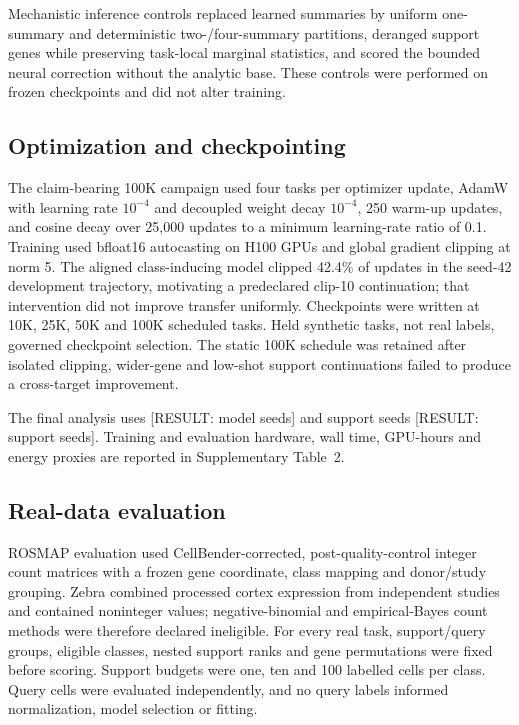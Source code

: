 \documentclass[12pt]{article}
\newcommand{\resultplaceholder}[1]{\textcolor{red!75!black}{[RESULT: #1]}}
\begin{document}
Mechanistic inference controls replaced learned summaries by uniform one-summary and deterministic two-/four-summary partitions, deranged support genes while preserving task-local marginal statistics, and scored the bounded neural correction without the analytic base. These controls were performed on frozen checkpoints and did not alter training.

\subsection*{Optimization and checkpointing}

The claim-bearing 100K campaign used four tasks per optimizer update, AdamW with learning rate $10^{-4}$ and decoupled weight decay $10^{-4}$\cite{loshchilov2019adamw}, 250 warm-up updates, and cosine decay over 25,000 updates to a minimum learning-rate ratio of 0.1\cite{loshchilov2017sgdr}. Training used bfloat16 autocasting on H100 GPUs and global gradient clipping at norm 5. The aligned class-inducing model clipped 42.4\% of updates in the seed-42 development trajectory, motivating a predeclared clip-10 continuation; that intervention did not improve transfer uniformly. Checkpoints were written at 10K, 25K, 50K and 100K scheduled tasks. Held synthetic tasks, not real labels, governed checkpoint selection. The static 100K schedule was retained after isolated clipping, wider-gene and low-shot support continuations failed to produce a cross-target improvement.

The final analysis uses \resultplaceholder{model seeds} and support seeds \resultplaceholder{support seeds}. Training and evaluation hardware, wall time, GPU-hours and energy proxies are reported in Supplementary Table~2.

\subsection*{Real-data evaluation}

ROSMAP evaluation used CellBender-corrected, post-quality-control integer count matrices with a frozen gene coordinate, class mapping and donor/study grouping. Zebra combined processed cortex expression from independent studies and contained noninteger values; negative-binomial and empirical-Bayes count methods were therefore declared ineligible. For every real task, support/query groups, eligible classes, nested support ranks and gene permutations were fixed before scoring. Support budgets were one, ten and 100 labelled cells per class. Query cells were evaluated independently, and no query labels informed normalization, model selection or fitting.
\end{document}
